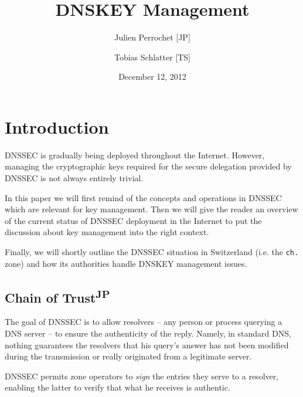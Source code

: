 \documentclass[a4paper,twocolumn]{scrartcl}
\title{DNSKEY Management}
\author{Julien Perrochet [JP] \and Tobias Schlatter [TS]}
\date{December 12, 2012}
\newcommand{\wbjp}{\textsuperscript{JP}}
\begin{document}



\section{Introduction}
DNSSEC is gradually being deployed throughout the Internet. However, managing
the cryptographic keys required for the secure delegation provided by
DNSSEC is not always entirely trivial.

In this paper we will first remind of the concepts and operations in
DNSSEC which are relevant for key management. Then we will give the
reader an overview of the current status of DNSSEC deployment in the
Internet to put the discussion about key management into the right
context.

Finally, we will shortly outline the DNSSEC situation in Switzerland
(i.e. the \verb|ch.| zone) and how its authorities handle DNSKEY management
issues.

\subsection{Chain of Trust\wbjp}
The goal of DNSSEC is to allow resolvers -- any person or process querying a DNS server -- to ensure the authenticity of the reply. Namely, in standard DNS, nothing guarantees the resolvers that his query's answer has not been modified during the transmission or really originated from a legitimate server.

DNSSEC permits zone operators to \emph{sign} the entries they serve to a resolver, enabling the latter to verify that what he receives is authentic.
\end{document}
